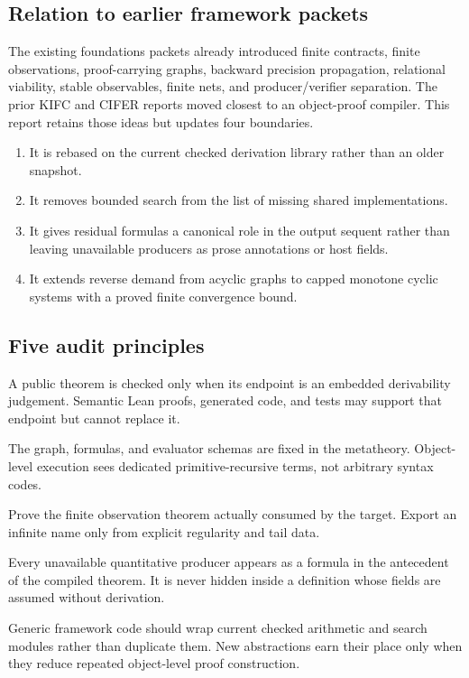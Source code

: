 \subsection{Relation to earlier framework packets}

The existing foundations packets already introduced finite contracts, finite observations, proof-carrying graphs, backward precision propagation, relational viability, stable observables, finite nets, and producer/verifier separation.  The prior KIFC and CIFER reports moved closest to an object-proof compiler.  This report retains those ideas but updates four boundaries.
\begin{enumerate}[label=(\arabic*)]
  \item It is rebased on the current checked derivation library rather than an older snapshot.
  \item It removes bounded search from the list of missing shared implementations.
  \item It gives residual formulas a canonical role in the output sequent rather than leaving unavailable producers as prose annotations or host fields.
  \item It extends reverse demand from acyclic graphs to capped monotone cyclic systems with a proved finite convergence bound.
\end{enumerate}

\subsection{Five audit principles}

\begin{principle}
A public theorem is checked only when its endpoint is an embedded derivability judgement.  Semantic Lean proofs, generated code, and tests may support that endpoint but cannot replace it.
\end{principle}

\begin{principle}
The graph, formulas, and evaluator schemas are fixed in the metatheory.  Object-level execution sees dedicated primitive-recursive terms, not arbitrary syntax codes.
\end{principle}

\begin{principle}
Prove the finite observation theorem actually consumed by the target.  Export an infinite name only from explicit regularity and tail data.
\end{principle}

\begin{principle}
Every unavailable quantitative producer appears as a formula in the antecedent of the compiled theorem.  It is never hidden inside a definition whose fields are assumed without derivation.
\end{principle}

\begin{principle}
Generic framework code should wrap current checked arithmetic and search modules rather than duplicate them.  New abstractions earn their place only when they reduce repeated object-level proof construction.
\end{principle}
